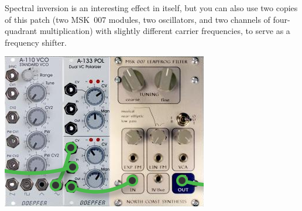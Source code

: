 Spectral inversion is an interesting effect in itself, but you can also use
two copies of this patch (two MSK~007 modules, two oscillators,
and two channels of four-quadrant multiplication) with slightly
different carrier frequencies, to serve as a frequency shifter.

\nopagebreak\noindent
{\hspace*{\fill}\includegraphics[scale=0.6]{patch9.png}\hspace*{\fill}\par} 
